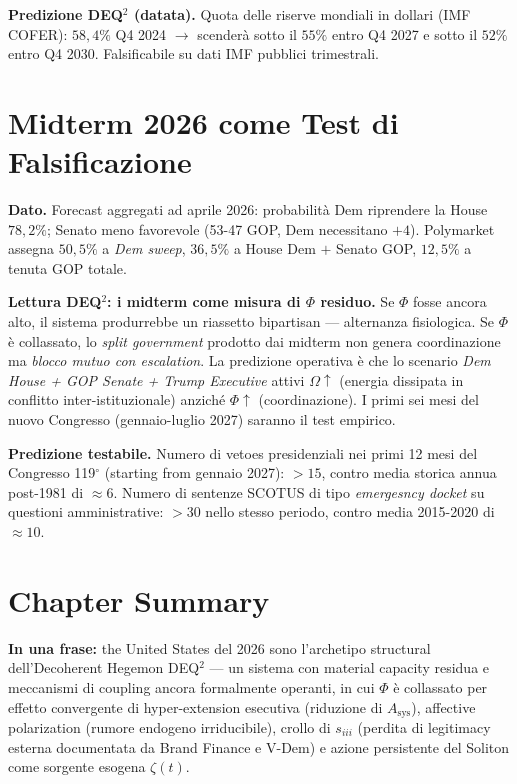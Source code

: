 \Conj{} \textbf{Predizione DEQ$^2$ (datata).} Quota delle riserve mondiali
in dollari (IMF COFER): \(58{,}4\%\) Q4 2024 \(\to\) scenderà sotto il
\(55\%\) entro Q4 2027 e sotto il \(52\%\) entro Q4 2030. Falsificabile
su dati IMF pubblici trimestrali.



\section{Midterm 2026 come Test di
Falsificazione}\label{midterm-2026-come-test-di-falsification}

\Proved{} \textbf{Dato.} Forecast aggregati ad aprile 2026: probabilità
Dem riprendere la House \(78{,}2\%\); Senato meno favorevole (53-47 GOP,
Dem necessitano \(+4\)). Polymarket assegna \(50{,}5\%\) a \emph{Dem
sweep}, \(36{,}5\%\) a House Dem \(+\) Senato GOP, \(12{,}5\%\) a tenuta
GOP totale.

\Hypoth{} \textbf{Lettura DEQ$^2$: i midterm come misura di \(\Phi\)
residuo.} Se \(\Phi\) fosse ancora alto, il sistema produrrebbe un
riassetto bipartisan --- alternanza fisiologica. Se \(\Phi\) è
collassato, lo \emph{split government} prodotto dai midterm non genera
coordinazione ma \emph{blocco mutuo con escalation}. La predizione
operativa è che lo scenario \emph{Dem House + GOP Senate + Trump
Executive} attivi \(\Omega \uparrow\) (energia dissipata in conflitto
inter-istituzionale) anziché \(\Phi \uparrow\) (coordinazione). I primi
sei mesi del nuovo Congresso (gennaio-luglio 2027) saranno il test
empirico.

\Conj{} \textbf{Predizione testabile.} Numero di vetoes presidenziali
nei primi 12 mesi del Congresso 119$^\circ$ (starting from gennaio 2027):
\(> 15\), contro media storica annua post-1981 di \(\approx 6\). Numero
di sentenze SCOTUS di tipo \emph{emergesncy docket} su questioni
amministrative: \(> 30\) nello stesso periodo, contro media 2015-2020 di
\(\approx 10\).



\section{Chapter Summary}\label{sintesi-del-chapter}

\Proved{} \textbf{In una frase:} the United States del 2026 sono
l'archetipo structural dell'Decoherent Hegemon DEQ$^2$ --- un sistema con
material capacity residua e meccanismi di coupling ancora
formalmente operanti, in cui \(\Phi\) è collassato per effetto
convergente di hyper-extension esecutiva (riduzione di
\(A_{\text{sys}}\)), affective polarization (rumore endogeno
irriducibile), crollo di \(s_{iii}\) (perdita di legitimacy esterna
documentata da Brand Finance e V-Dem) e azione persistente del Soliton
come sorgente esogena \(\zeta(t)\).

